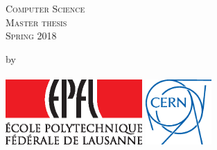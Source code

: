 \begin{titlepage}

\begin{center}
\textsc{\large Computer Science\\ Master thesis\\ Spring 2018}
\end{center}


\vspace{2cm}
\begin{center}
\linespread{1.3}\huge \bfseries \ttitle
\end{center}
\vspace{2cm}
\begin{center}
by \\[0.3cm]
\authornames\\[6cm]
\includegraphics[height=2.5cm]{./Images/EPFL.eps}
\hspace{1cm}
\includegraphics[height=2.5cm]{./Images/CERN.eps}
\vfill
\end{center}

\end{titlepage}
